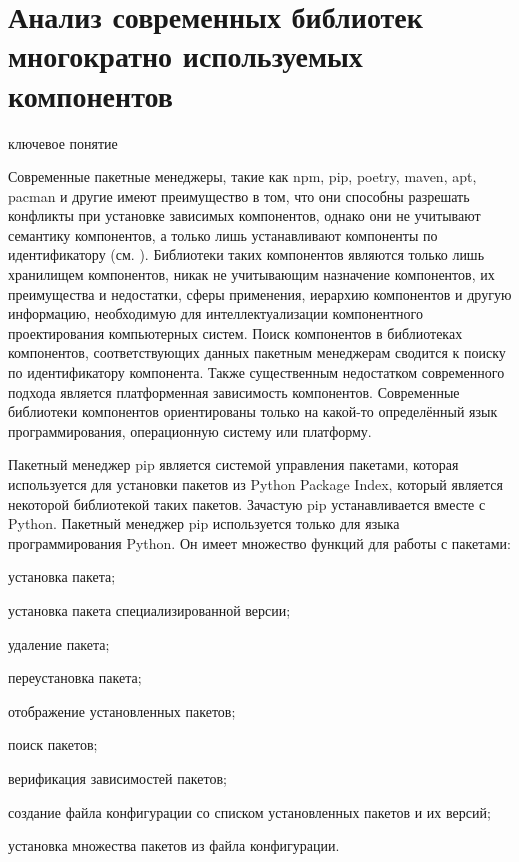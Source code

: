 \section{Анализ современных библиотек многократно используемых компонентов}
\label{ostis_library_analysis}

\begin{SCn}
\begin{scnrelfromlist}{ключевое понятие}
\end{scnrelfromlist}
\end{SCn}

\bigskip

Современные пакетные менеджеры, такие как npm, pip, poetry, maven, apt, pacman и другие имеют преимущество в том, что они способны разрешать конфликты при установке зависимых компонентов, однако они не учитывают семантику компонентов, а только лишь устанавливают компоненты по идентификатору (см. ). Библиотеки таких компонентов являются только лишь хранилищем компонентов, никак не учитывающим назначение компонентов, их преимущества и недостатки, сферы применения, иерархию компонентов и другую информацию, необходимую для интеллектуализации компонентного проектирования компьютерных систем. Поиск компонентов в библиотеках компонентов, соответствующих данных пакетным менеджерам сводится к поиску по идентификатору компонента. Также существенным недостатком современного подхода является платформенная зависимость компонентов. Современные библиотеки компонентов ориентированы только на какой-то определённый язык программирования, операционную систему или платформу.

Пакетный менеджер pip является системой управления пакетами, которая используется для установки пакетов из Python Package Index, который является некоторой библиотекой таких пакетов. Зачастую pip устанавливается вместе с Python. Пакетный менеджер pip используется только для языка программирования Python. 
Он имеет множество функций для работы с пакетами:

\begin{textitemize}
	\item установка пакета;
	\item установка пакета специализированной версии;
	\item удаление пакета;
	\item переустановка пакета;
	\item отображение установленных пакетов;
	\item поиск пакетов;
	\item верификация зависимостей пакетов;
	\item создание файла конфигурации со списком установленных пакетов и их версий;
	\item установка множества пакетов из файла конфигурации.
\end{textitemize}

